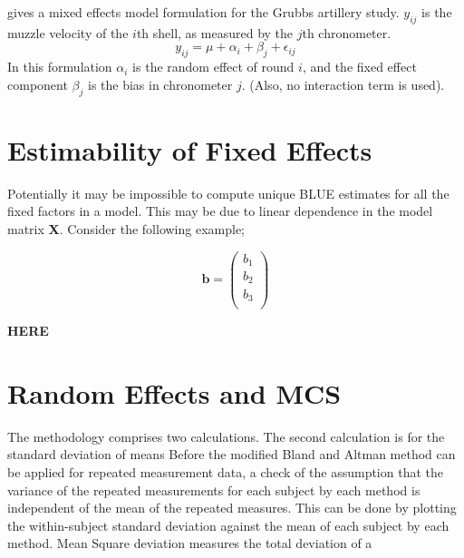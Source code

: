 \documentclass[12pt, a4paper]{report}
\theoremstyle{plain}
\theoremstyle{definition}
\theoremstyle{remark}
\begin{document}
\citet{Searle} gives a mixed effects model formulation for the
Grubbs artillery study. $y_{ij}$ is the muzzle velocity of the
$i$th shell, as measured by the $j$th chronometer.
\begin{equation}
y_{ij} = \mu + \alpha_{i} + \beta_{j}  + \epsilon_{ij}
\end{equation}
In this formulation $\alpha_{i}$ is the random effect of round
$i$, and the fixed effect component $\beta_{j}$ is the bias in
chronometer $j$. (Also, no interaction term is used).





\section{Estimability of Fixed Effects}
Potentially it may be impossible to compute unique BLUE estimates for all the fixed factors in a model. This may be due to linear dependence in the model
matrix \textbf{X}. Consider the following example;


\begin{equation}
\textbf{b}= \left( \begin{array}{c}
b_{1} \\
b_{2} \\
b_{3} \\
\end{array}  \right)
\end{equation}

\textbf{HERE}









\section{Random Effects and MCS}
The methodology comprises two calculations. The second calculation
is for the standard deviation of means Before the modified Bland
and Altman method can be applied for repeated measurement data, a
check of the assumption that the variance of the repeated
measurements for each subject by each method is independent of the
mean of the repeated measures. This can be done by plotting the
within-subject standard deviation against the mean of each subject
by each method. Mean Square deviation measures the total deviation
of a
\end{document}
